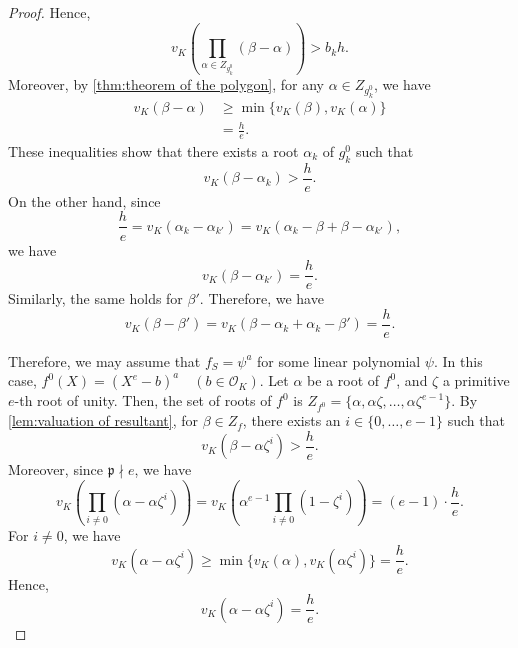 \documentclass{article}
\theoremstyle{definition}
\theoremstyle{remark}
\numberwithin{equation}{section}
\begin{document}
\begin{proof}
    Hence, 
    \[
      v_K(\prod_{\alpha \in Z_{g_k^0}} (\beta - \alpha)) > b_k h. 
    \]
    Moreover, by \cref{thm:theorem of the polygon}, for any $\alpha \in Z_{g_k^0}$, we have 
    \begin{align}
      v_K(\beta - \alpha) &\ge \min\{v_K(\beta),v_K(\alpha)\} \\
      &=\frac{h}{e}. 
    \end{align}
    These inequalities show that there exists a root $\alpha_k$ of $g_k^0$ such that 
    \[
      v_K(\beta - \alpha_k) > \frac{h}{e}. 
    \]
    On the other hand, since
    \[
      \frac{h}{e} = v_K(\alpha_k - \alpha_{k'}) = v_K(\alpha_k - \beta + \beta - \alpha_{k'}), 
    \]
    we have 
    \[
      v_K(\beta - \alpha_{k'}) = \frac{h}{e}. 
    \]
    Similarly, the same holds for $\beta'$. Therefore, we have 
    \[
      v_K(\beta - \beta') = v_K(\beta - \alpha_k + \alpha_k - \beta') = \frac{h}{e}. 
    \]

    Therefore, we may assume that $f_S = \psi^a$ for some linear polynomial $\psi$. 
    In this case, $f^0(X) = (X^e - b)^a \quad (b \in \mathcal{O}_K)$. 
    Let $\alpha$ be a root of $f^0$, and $\zeta$ a primitive $e$-th root of unity. 
    Then, the set of roots of $f^0$ is $Z_{f^0} = \{\alpha,\alpha\zeta, \dots ,\alpha\zeta^{e-1}\}$. 
    By \cref{lem:valuation of resultant}, for $\beta \in Z_f$, there exists an $i \in \{0, \dots ,e-1\}$ such that 
    \[
      v_K(\beta - \alpha\zeta^i) > \frac{h}{e}. 
    \]
    Moreover, since $\mathfrak{p} \nmid e$, we have 
    \[
      v_K(\prod_{i \ne 0} (\alpha - \alpha\zeta^i)) = v_K(\alpha^{e - 1}\prod_{i \ne 0} (1 - \zeta^i)) = (e - 1) \cdot \frac{h}{e}. 
    \]
    For $i \ne 0$, we have 
    \[
      v_K(\alpha - \alpha\zeta^i) \ge \min\{v_K(\alpha),v_K(\alpha\zeta^i)\} = \frac{h}{e}. 
    \]
    Hence, 
    \[
      v_K(\alpha - \alpha\zeta^i) = \frac{h}{e} \label{formula:lem-1}. 
    \]


\end{proof}
\end{document}
